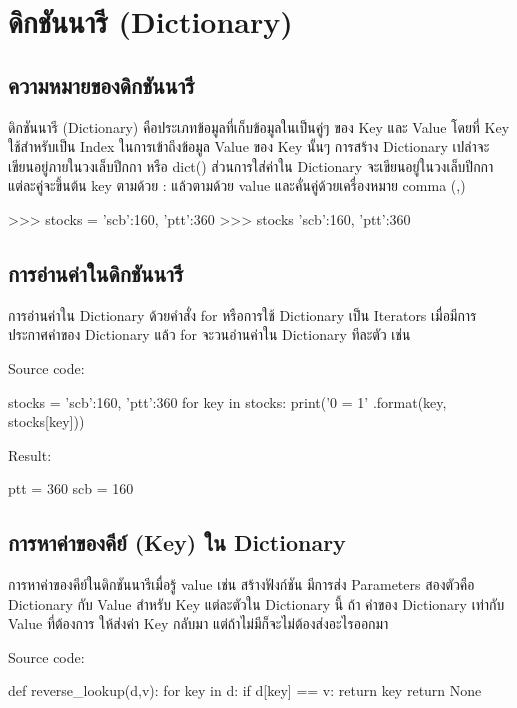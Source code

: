 \chapter{ดิกชันนารี (Dictionary)}
\section{ความหมายของดิกชันนารี}

ดิกชันนารี (Dictionary) คือประเภทข้อมูลที่เก็บข้อมูลในเป็นคู่ๆ ของ Key และ Value โดยที่ Key ใช้สำหรับเป็น Index ในการเข้าถึงข้อมูล Value ของ Key นั้นๆ การสร้าง Dictionary เปล่าจะเขียนอยู่ภายในวงเล็บปีกกา { } หรือ dict() ส่วนการใส่ค่าใน Dictionary จะเขียนอยู่ในวงเล็บปีกกา แต่ละคู่จะขึ้นต้น key ตามด้วย : แล้วตามด้วย value และคั่นคู่ด้วยเครื่องหมาย comma (,) 

\begin{pycode}
>>> stocks = {'scb':160, 'ptt':360}
>>> stocks
{'scb':160, 'ptt':360}
\end{pycode}


\section{การอ่านค่าในดิกชันนารี}

การอ่านค่าใน Dictionary ด้วยคำสั่ง for หรือการใช้ Dictionary เป็น Iterators เมื่อมีการประกาศค่าของ Dictionary แล้ว for จะวนอ่านค่าใน Dictionary ทีละตัว เช่น 

Source code:
\begin{pycode}
stocks = {'scb':160, 'ptt':360}
for key in stocks:
    print('{0} = {1}' .format(key, stocks[key]))
\end{pycode}

Result:
\begin{pycode}
ptt = 360
scb = 160
\end{pycode}


\section{การหาค่าของคีย์ (Key) ใน Dictionary}
การหาค่าของคีย์ในดิกชันนารีเมื่อรู้ value เช่น สร้างฟังก์ชัน  มีการส่ง Parameters สองตัวคือ Dictionary กับ Value สำหรับ Key แต่ละตัวใน Dictionary นี้ ถ้า ค่าของ Dictionary เท่ากับ Value ที่ต้องการ ให้ส่งค่า Key กลับมา แต่ถ้าไม่มีก็จะไม่ต้องส่งอะไรออกมา

Source code:
\begin{pycode}
def reverse_lookup(d,v):
    for key in d:
        if d[key] == v: return key
    return None
\end{pycode}

